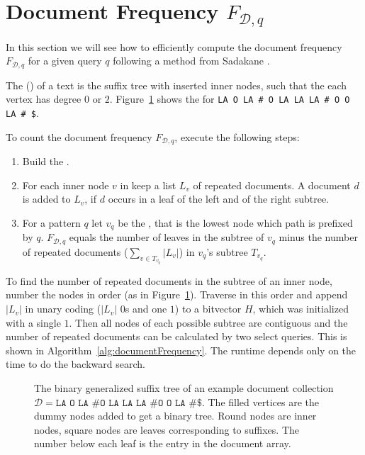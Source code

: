 \section{Document Frequency $F_{\mathcal{D},q}$}

In this section we will see how to efficiently compute the document frequency $F_{\mathcal{D},q}$ for a given query $q$ following a method from Sadakane \cite{Sadakane2007}.

\begin{Definition}
  The  () of a text is the suffix tree with inserted inner nodes, such that the each vertex has degree $0$ or $2$. Figure~\ref{fig:binaryGeneralizedSuffixTreeExample} shows the  for \texttt{LA O LA \# O LA LA LA \# O O LA \# \$}.
\end{Definition}

To count the document frequency $F_{\mathcal{D},q}$, execute the following steps:
\begin{enumerate}
  \item Build the .
  \item For each inner node $v$ in  keep a list $L_v$ of repeated documents. A document $d$ is added to $L_v$, if $d$ occurs in a leaf of the left and of the right subtree.
  \item For a pattern $q$ let $v_q$ be the , that is the lowest node which path is prefixed by $q$. $F_{\mathcal{D},q}$ equals the number of leaves in the subtree of $v_q$ minus the number of repeated documents ($\sum_{v \in T_{v_q}} \vert L_v \vert$) in $v_q$'s subtree $T_{v_q}$.
\end{enumerate}
To find the number of repeated documents in the subtree of an inner node, number the nodes in order (as in Figure~\ref{fig:binaryGeneralizedSuffixTreeExample}). Traverse in this order and append $\vert L_v \vert$ in unary coding ($\vert L_v \vert$ $0$s and one $1$) to a bitvector $H$, which was initialized with a single $1$. Then all nodes of each possible subtree are contiguous and the number of repeated documents can be calculated by two select queries. This is shown in Algorithm~\ref{alg:documentFrequency}. The runtime depends only on the time to do the backward search.

\begin{figure}[htb]
  \centering
  
  \caption{The binary generalized suffix tree of an example document collection $\mathcal{D} = \texttt{LA O LA \# O LA LA LA \# O O LA \# \$}$. The filled vertices are the dummy nodes added to get a binary tree. Round nodes are inner nodes, square nodes are leaves corresponding to suffixes. The number below each leaf is the entry in the document array.}
  \label{fig:binaryGeneralizedSuffixTreeExample}
\end{figure}

